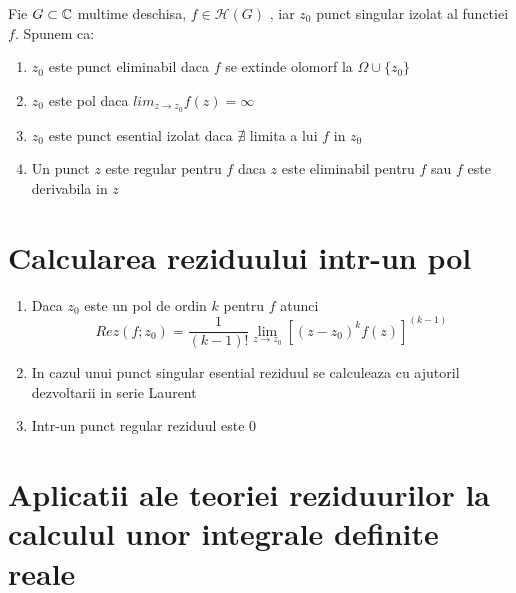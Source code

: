 \begin{definition}
    Fie $G \subset \mathbb{C}$ multime deschisa, $f\in\mathcal{H}(G)$ , iar $z_0$ punct singular
    izolat al functiei $f$. Spunem ca:
    \begin{enumerate}
        \item  $z_0$ este punct eliminabil daca $f$ se extinde olomorf la $\Omega \cup \{z_0\}$
        \item  $z_0$ este pol daca $lim_{z \to z_0} f(z) = \infty$
        \item  $z_0$ este punct esential izolat daca $\nexists$ limita a lui $f$ in $z_0$
        \item Un punct $z$ este regular pentru $f$ daca $z$ este eliminabil pentru $f$
        sau $f$ este derivabila in $z$
    \end{enumerate}
\end{definition}

\section{Calcularea reziduului intr-un pol}
\begin{enumerate}
    \item Daca $z_0$ este un pol de ordin $k$ pentru $f$ atunci
    \[
    Rez(f;z_0) = \frac{1}{(k-1)!}\lim_{z \to z_0} \left[(z-z_0)^k f(z) \right]^{(k-1)}
    \]
    \item In cazul unui punct singular esential reziduul se calculeaza cu ajutoril dezvoltarii
    in serie Laurent
    \item Intr-un punct regular reziduul este 0
\end{enumerate}

\section{Aplicatii ale teoriei reziduurilor la calculul unor integrale definite reale}

